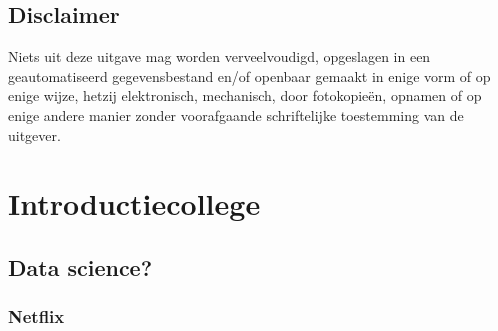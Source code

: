 \documentclass[]{tufte-book}
\begin{document}
\hypertarget{disclaimer}{%
\section*{Disclaimer}\label{disclaimer}}

Niets uit deze uitgave mag worden verveelvoudigd, opgeslagen in een geautomatiseerd gegevensbestand en/of openbaar gemaakt in enige vorm of op enige wijze, hetzij elektronisch, mechanisch, door fotokopieën, opnamen of op enige andere manier zonder voorafgaande schriftelijke toestemming van de uitgever.

\hypertarget{introductiecollege}{%
\chapter{Introductiecollege}\label{introductiecollege}}

\hypertarget{data-science}{%
\section{Data science?}\label{data-science}}

\hypertarget{netflix}{%
\subsection{Netflix}\label{netflix}}
\end{document}
